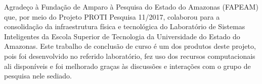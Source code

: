 Agradeço à Fundação de Amparo à Pesquisa do Estado do Amazonas (FAPEAM) que, por meio do Projeto PROTI Pesquisa 11/2017, colaborou para a consolidação da infraestrutura física e tecnológica do Laboratório de Sistemas Inteligentes da Escola Superior de Tecnologia da Universidade do Estado do Amazonas. Este trabalho de conclusão de curso é um dos produtos deste projeto, pois foi desenvolvido no referido laboratório, fez uso dos recursos  computacionais ali disponíveis e foi melhorado graças às discussões e interações com o grupo de pesquisa nele sediado.
